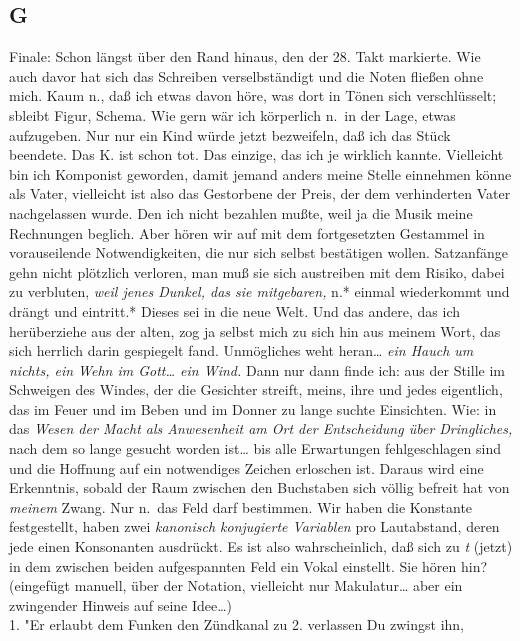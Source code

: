 \documentclass[
]{article}
\author{}
\date{\vspace{-2.5em}}
\begin{document}
\subsection{G}\label{g}

Finale: Schon längst über den Rand hinaus, den der 28. Takt markierte.
Wie auch davor hat sich das Schreiben verselbständigt und die Noten
fließen ohne mich. Kaum n., daß ich etwas davon höre, was dort in Tönen
sich verschlüsselt; sbleibt Figur, Schema. Wie gern wär ich körperlich
n.~in der Lage, etwas aufzugeben. Nur nur ein Kind würde jetzt
bezweifeln, daß ich das Stück beendete. Das K. ist schon tot. Das
einzige, das ich je wirklich kannte. Vielleicht bin ich Komponist
geworden, damit jemand anders meine Stelle einnehmen könne als Vater,
vielleicht ist also das Gestorbene der Preis, der dem verhinderten Vater
nachgelassen wurde. Den ich nicht bezahlen mußte, weil ja die Musik
meine Rechnungen beglich. Aber hören wir auf mit dem fortgesetzten
Gestammel in vorauseilende Notwendigkeiten, die nur sich selbst
bestätigen wollen. Satzanfänge gehn nicht plötzlich verloren, man muß
sie sich austreiben mit dem Risiko, dabei zu verbluten, \emph{weil jenes
Dunkel, das sie mitgebaren, }n.* einmal wiederkommt und drängt und
eintritt.* Dieses sei in die neue Welt. Und das andere, das ich
herüberziehe aus der alten, zog ja selbst mich zu sich hin aus meinem
Wort, das sich herrlich darin gespiegelt fand. Unmögliches weht
heran\ldots{} \emph{ein Hauch um nichts, ein Wehn im Gott\ldots{} ein
Wind.} Dann nur dann finde ich: aus der Stille im Schweigen des Windes,
der die Gesichter streift, meins, ihre und jedes eigentlich, das im
Feuer und im Beben und im Donner zu lange suchte Einsichten. Wie: in das
\emph{Wesen der Macht als Anwesenheit am Ort der Entscheidung über
Dringliches,} nach dem so lange gesucht worden ist\ldots{} bis alle
Erwartungen fehlgeschlagen sind und die Hoffnung auf ein notwendiges
Zeichen erloschen ist. Daraus wird eine Erkenntnis, sobald der Raum
zwischen den Buchstaben sich völlig befreit hat von \emph{meinem} Zwang.
Nur n.~das Feld darf bestimmen. Wir haben die Konstante festgestellt,
haben zwei \emph{kanonisch konjugierte Variablen }pro Lautabstand, deren
jede einen Konsonanten ausdrückt. Es ist also wahrscheinlich, daß sich
zu \emph{t} (jetzt) in dem zwischen beiden aufgespannten Feld ein Vokal
einstellt. Sie hören hin?\\
(eingefügt manuell, über der Notation, vielleicht nur Makulatur\ldots{}
aber ein zwingender Hinweis auf seine Idee\ldots)\\
1. "Er erlaubt dem Funken den Zündkanal zu 2. verlassen Du zwingst ihn,
\end{document}
